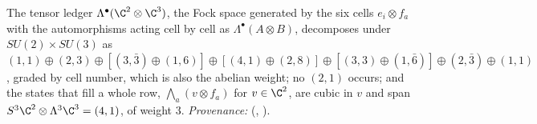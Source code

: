 The tensor ledger $\Lambda^{\bullet}(\C^{2} \otimes \C^{3})$, the Fock space generated by the six cells $e_{i} \otimes f_{a}$ with the automorphisms acting cell by cell as $\Lambda^{\bullet}(A \otimes B)$, decomposes under $SU(2) \times SU(3)$ as $(1,1) \oplus (2,3) \oplus [(3,\bar{3}) \oplus (1,6)] \oplus [(4,1) \oplus (2,8)] \oplus [(3,3) \oplus (1,\bar{6})] \oplus (2,\bar{3}) \oplus (1,1)$, graded by cell number, which is also the abelian weight; no $(2,1)$ occurs; and the states that fill a whole row, $\bigwedge_{a}(v \otimes f_{a})$ for $v \in \C^{2}$, are cubic in $v$ and span $S^{3}\C^{2} \otimes \Lambda^{3}\C^{3} = (4,1)$, of weight $3$. \emph{Provenance:} \cite[Prop.~5.1 and Prop.~5.3(2)]{ButlerT12} (, ).
